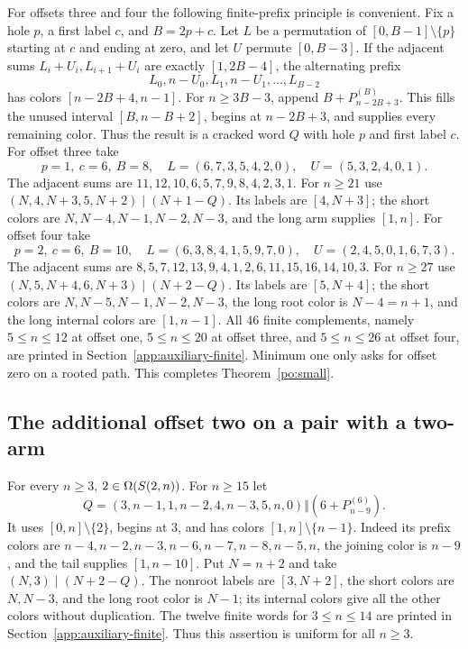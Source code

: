 For offsets three and four the following finite-prefix principle is convenient. Fix a hole $p$, a first label $c$, and $B=2p+c$. Let $L$ be a permutation of $[0,B-1]\setminus\{p\}$ starting at $c$ and ending at zero, and let $U$ permute $[0,B-3]$. If the adjacent sums $L_i+U_i,L_{i+1}+U_i$ are exactly $[1,2B-4]$, the alternating prefix
\[
L_0,n-U_0,L_1,n-U_1,\ldots,L_{B-2}
\]
has colors $[n-2B+4,n-1]$. For $n\ge3B-3$, append $B+P_{n-2B+3}^{(B)}$. This fills the unused interval $[B,n-B+2]$, begins at $n-2B+3$, and supplies every remaining color. Thus the result is a cracked word $Q$ with hole $p$ and first label $c$.
For offset three take
\[
p=1,\ c=6,\ B=8,\quad L=(6,7,3,5,4,2,0),\quad U=(5,3,2,4,0,1).
\]
The adjacent sums are $11,12,10,6,5,7,9,8,4,2,3,1$. For $n\ge21$ use $(N,4,N+3,5,N+2)\mid(N+1-Q)$. Its labels are $[4,N+3]$; the short colors are $N,N-4,N-1,N-2,N-3$, and the long arm supplies $[1,n]$.
For offset four take
\[
p=2,\ c=6,\ B=10,\quad L=(6,3,8,4,1,5,9,7,0),\quad U=(2,4,5,0,1,6,7,3).
\]
The adjacent sums are $8,5,7,12,13,9,4,1,2,6,11,15,16,14,10,3$. For $n\ge27$ use $(N,5,N+4,6,N+3)\mid(N+2-Q)$. Its labels are $[5,N+4]$; the short colors are $N,N-5,N-1,N-2,N-3$, the long root color is $N-4=n+1$, and the long internal colors are $[1,n-1]$. All $46$ finite complements, namely $5\le n\le12$ at offset one, $5\le n\le20$ at offset three, and $5\le n\le26$ at offset four, are printed in Section~\ref{app:auxiliary-finite}. Minimum one only asks for offset zero on a rooted path. This completes Theorem~\ref{po:small}.

\subsection{The additional offset two on a pair with a two-arm}\label{po:two-extra}
For every $n\ge3$, $2\in\Omega(S\!\left(2,n\right))$. For $n\ge15$ let
\[
Q=(3,n-1,1,n-2,4,n-3,5,n,0)\Vert(6+P_{n-9}^{(6)}).
\]
It uses $[0,n]\setminus\{2\}$, begins at $3$, and has colors $[1,n]\setminus\{n-1\}$. Indeed its prefix colors are $n-4,n-2,n-3,n-6,n-7,n-8,n-5,n$, the joining color is $n-9$, and the tail supplies $[1,n-10]$. Put $N=n+2$ and take $(N,3)\mid(N+2-Q)$. The nonroot labels are $[3,N+2]$, the short colors are $N,N-3$, and the long root color is $N-1$; its internal colors give all the other colors without duplication. The twelve finite words for $3\le n\le14$ are printed in Section~\ref{app:auxiliary-finite}. Thus this assertion is uniform for all $n\ge3$.

